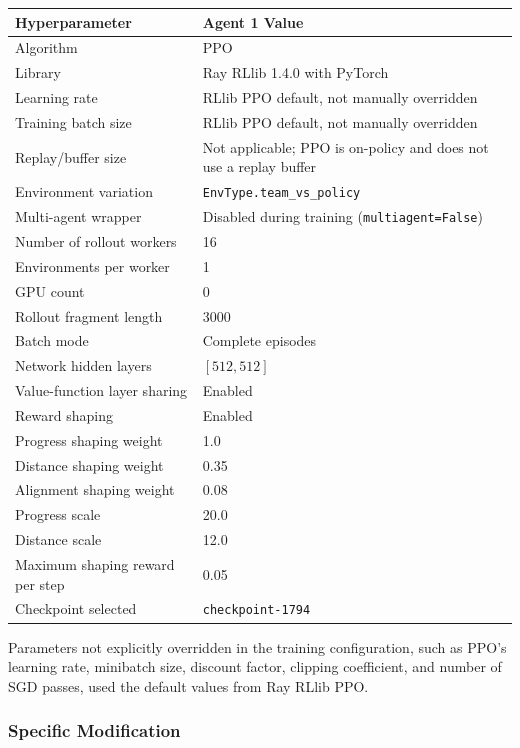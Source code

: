 \documentclass{article}
\begin{document}
\begin{center}
\begin{tabular}{|l|l|}
\hline
\textbf{Hyperparameter} & \textbf{Agent 1 Value} \\
\hline
Algorithm & PPO \\
\hline
Library & Ray RLlib 1.4.0 with PyTorch \\
\hline
Learning rate & RLlib PPO default, not manually overridden \\
\hline
Training batch size & RLlib PPO default, not manually overridden \\
\hline
Replay/buffer size & Not applicable; PPO is on-policy and does not use a replay buffer \\
\hline
Environment variation & \texttt{EnvType.team\_vs\_policy} \\
\hline
Multi-agent wrapper & Disabled during training (\texttt{multiagent=False}) \\
\hline
Number of rollout workers & 16 \\
\hline
Environments per worker & 1 \\
\hline
GPU count & 0 \\
\hline
Rollout fragment length & 3000 \\
\hline
Batch mode & Complete episodes \\
\hline
Network hidden layers & $[512, 512]$ \\
\hline
Value-function layer sharing & Enabled \\
\hline
Reward shaping & Enabled \\
\hline
Progress shaping weight & 1.0 \\
\hline
Distance shaping weight & 0.35 \\
\hline
Alignment shaping weight & 0.08 \\
\hline
Progress scale & 20.0 \\
\hline
Distance scale & 12.0 \\
\hline
Maximum shaping reward per step & 0.05 \\
\hline
Checkpoint selected & \texttt{checkpoint-1794} \\
\hline
\end{tabular}
\end{center}

Parameters not explicitly overridden in the training configuration, such as PPO's learning rate, minibatch size, discount factor, clipping coefficient, and number of SGD passes, used the default values from Ray RLlib PPO.

\subsubsection{Specific Modification}
\end{document}
